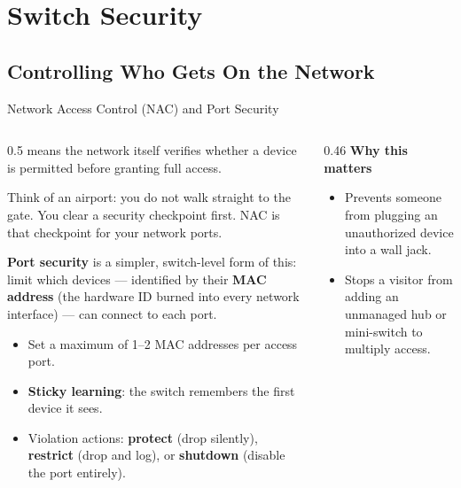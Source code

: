 \documentclass[aspectratio=169]{beamer}  %
\begin{document}
\section{Switch Security}
\subsection{Controlling Who Gets On the Network}


\begin{frame}{Network Access Control (NAC) and Port Security}
    \begin{columns}[T]
        \begin{column}{0.5\textwidth}
            \footnotesize
             means the network itself verifies whether a device is permitted before granting full access.

            \vspace{0.3em}
            Think of an airport: you do not walk straight to the gate. You clear a security checkpoint first. NAC is that checkpoint for your network ports.

            \vspace{0.3em}
            \textbf{Port security} is a simpler, switch-level form of this: limit which devices --- identified by their \textbf{MAC address} (the hardware ID burned into every network interface) --- can connect to each port.

            \begin{itemize}
                \item Set a maximum of 1--2 MAC addresses per access port.
                \item \textbf{Sticky learning}: the switch remembers the first device it sees.
                \item Violation actions: \textbf{protect} (drop silently), \textbf{restrict} (drop and log), or \textbf{shutdown} (disable the port entirely).
            \end{itemize}
        \end{column}
        \begin{column}{0.46\textwidth}
            \footnotesize
            \textbf{Why this matters}
            \begin{itemize}
                \item Prevents someone from plugging an unauthorized device into a wall jack.
                \item Stops a visitor from adding an unmanaged hub or mini-switch to multiply access.
            \end{itemize}


\end{column}
\end{columns}
\end{frame}
\end{document}
